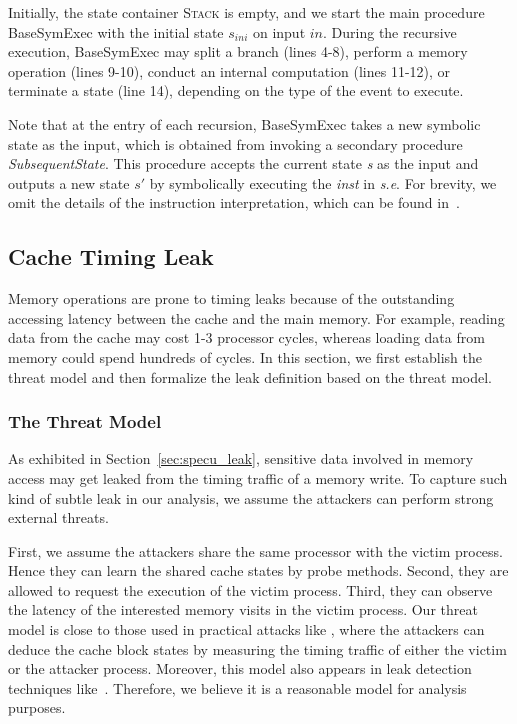 \documentclass[sigconf]{acmart}
\newcommand{\SymExec}{\textsf{BaseSymExec} }
\begin{document}
Initially, the state container \textsc{Stack} is empty, and we start the main 
procedure \SymExec with the initial state $\mathit{s_{ini}}$ on input $\mathit{in}$.
During the recursive execution, \SymExec may split a branch (lines 4-8), perform 
a memory operation (lines 9-10), conduct an internal computation (lines 11-12), 
or terminate a state (line 14), depending on the type of the event to execute.


Note that at the entry of each recursion, \SymExec takes a new symbolic state 
as the input, which is obtained from invoking a secondary procedure 
\textit{SubsequentState}. This procedure accepts the current state 
\textit{s} as the input and outputs a new state $s'$ by symbolically executing 
the \textit{inst} in \textit{s.e}. For brevity, we omit the details of the 
instruction interpretation, which can be found in~\cite{CadarDE08,PasareanuR10}.



\subsection{Cache Timing Leak}
\label{sec:leak}

Memory operations are prone to timing leaks because of the outstanding accessing 
latency between the cache and the main memory. For example, reading data from the 
cache may cost 1-3 processor cycles, whereas loading data from memory could spend 
hundreds of cycles. In this section, we first establish the threat model and then 
formalize the leak definition based on the threat model.


\subsubsection{The Threat Model}
\label{sec:threat}

As exhibited in Section~\ref{sec:specu_leak}, sensitive data involved in memory 
access may get leaked from the timing traffic of a memory write. To capture such 
kind of subtle leak in our analysis, we assume the attackers can perform strong 
external threats. 


First, we assume the attackers share the same processor with the victim process. 
Hence they can learn the shared cache states by probe methods. Second, they are 
allowed to request the execution of the victim process. Third, they can observe 
the latency of the interested memory visits in the victim process. Our threat 
model is close to those used in practical attacks like
\cite{OsvikST06,YaromF14,DisselkoenKPT17}, where the attackers can deduce the 
cache block states by measuring the timing traffic of either the victim or the 
attacker process. Moreover, this model also appears in leak detection techniques 
like~\cite{WangWLZW17,DoychevK17,WichelmannMES18,BrotzmanLZTK2018}. Therefore, 
we believe it is a reasonable model for analysis purposes.
\end{document}
